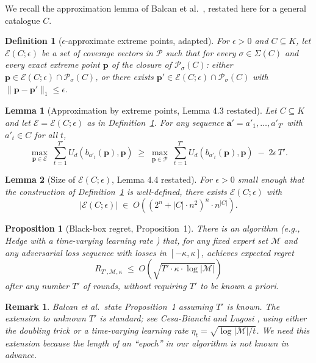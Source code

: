 \documentclass[11pt]{article}
\newtheorem{lemma}{Lemma}
\newtheorem{proposition}{Proposition}
\newtheorem{definition}{Definition}
\newtheorem{remark}{Remark}
\newcommand{\pvec}{\mathbf{p}}
\newcommand{\avec}{\mathbf{a}}
\newcommand{\cE}{\mathcal{E}}
\newcommand{\cP}{\mathcal{P}}
\newcommand{\cM}{\mathcal{M}}
\begin{document}
We recall the approximation lemma of Balcan et al.\ \cite[Lemmas~4.3--4.4]{balcan2015}, restated here for a general catalogue $C$.

\begin{definition}[$\epsilon$-approximate extreme points, \cite{balcan2015} adapted]\label{def:eps-extreme}
For $\epsilon > 0$ and $C \subseteq K$, let $\cE(C;\epsilon)$ be a set of coverage vectors in $\cP$ such that for every $\sigma \in \Sigma(C)$ and every exact extreme point $\pvec$ of the closure of $\cP_\sigma(C)$: either $\pvec \in \cE(C;\epsilon) \cap \cP_\sigma(C)$, or there exists $\pvec' \in \cE(C;\epsilon) \cap \cP_\sigma(C)$ with $\|\pvec - \pvec'\|_1 \le \epsilon$.
\end{definition}

\begin{lemma}[Approximation by extreme points, \cite{balcan2015} Lemma 4.3 restated]\label{lem:4.3}
Let $C \subseteq K$ and let $\cE = \cE(C;\epsilon)$ as in Definition~\ref{def:eps-extreme}. For any sequence $\avec' = a'_1,\dots,a'_{T'}$ with $a'_t \in C$ for all $t$,
\[
\max_{\pvec \in \cE}\; \sum_{t=1}^{T'} U_d(b_{a'_t}(\pvec), \pvec)
\;\ge\;
\max_{\pvec \in \cP}\; \sum_{t=1}^{T'} U_d(b_{a'_t}(\pvec), \pvec) \;-\; 2\epsilon\, T'.
\]
\end{lemma}

\begin{lemma}[Size of $\cE(C;\epsilon)$, \cite{balcan2015} Lemma 4.4 restated]\label{lem:4.4}
For $\epsilon > 0$ small enough that the construction of Definition~\ref{def:eps-extreme} is well-defined, there exists $\cE(C;\epsilon)$ with
\[
|\cE(C;\epsilon)| \;\in\; O\!\left((2^n + |C|\cdot n^2)^n \cdot n^{|C|}\right).
\]
\end{lemma}

\begin{proposition}[Black-box regret, \cite{balcan2015} Proposition~1]\label{prop:hedge}
There is an algorithm (e.g., Hedge with a time-varying learning rate \cite{cesa2006}) that, for any fixed expert set $\cM$ and any adversarial loss sequence with losses in $[-\kappa,\kappa]$, achieves expected regret
\[
R_{T',\cM,\kappa} \;\le\; O\!\left(\sqrt{T' \cdot \kappa \cdot \log|\cM|}\right)
\]
after any number $T'$ of rounds, \emph{without requiring $T'$ to be known a priori}.
\end{proposition}

\begin{remark}
Balcan et al.\ state Proposition~1 assuming $T'$ is known. The extension to unknown $T'$ is standard; see Cesa-Bianchi and Lugosi \cite[Chapter 2]{cesa2006}, using either the doubling trick or a time-varying learning rate $\eta_t = \sqrt{\log|\cM|/t}$. We need this extension because the length of an ``epoch'' in our algorithm is not known in advance.
\end{remark}
\end{document}

